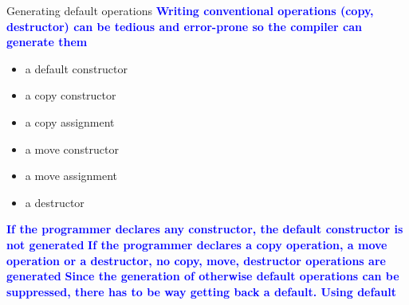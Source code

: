 \documentclass[13pt]{beamer}
\begin{document}
\begin{frame}{Generating default operations}
  \textcolor{blue}{\textbf{Writing conventional operations (copy, destructor) can be tedious and error-prone so the compiler can generate them}}
\begin{itemize}
\item a default constructor
\item a copy constructor
\item a copy assignment
\item a move constructor
\item a move assignment
\item a destructor
\end{itemize}
\textcolor{blue}{\textbf{If the programmer declares any constructor, the default constructor is not generated}}
\textcolor{blue}{\textbf{If the programmer declares a copy operation, a move operation or a destructor, no copy, move, destructor operations are generated}}
\textcolor{blue}{\textbf{Since the generation of otherwise default operations can be suppressed, there has to be way getting back a default. Using default}}
\end{frame}
\end{document}
